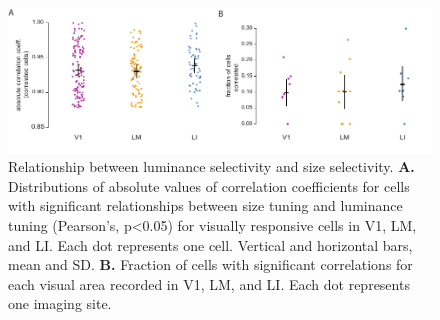 \begin{figure}[t!]
\includegraphics[width=\textwidth]{figures/supplemental/fig_s12_luminance_corr/fig_s12_luminance_corr.pdf}
    \vspace{.1in}
    \caption[Luminance and size tuning]{Relationship between luminance selectivity and size selectivity.
    \textbf{A.} Distributions of absolute values of correlation coefficients for cells with significant relationships between size tuning and luminance tuning (Pearson's, p<0.05) for visually responsive cells in V1, LM, and LI. Each dot represents one cell. Vertical and horizontal bars, mean and SD. 
    \textbf{B.} Fraction of cells with significant correlations for each visual area recorded in V1, LM, and LI. Each dot represents one imaging site.  
    \label{supfig:luminance_corr}}
\end{figure}



